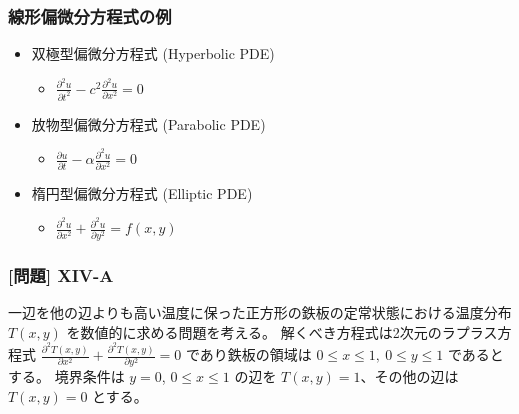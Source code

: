 \documentclass[dvipdfmx,aspectratio=169,20pt]{beamer}
\newcommand{\myfontsetting}[3]{{\fontsize{#1}{#2}\selectfont #3}}
\begin{document}
\begin{frame}
\frametitle{\myfontsetting{24pt}{24pt}{線形偏微分方程式の例}}

\begin{itemize}
    \setlength{\itemsep}{0.5cm}
    \item \myfontsetting{16pt}{16pt}{双極型偏微分方程式} \myfontsetting{12pt}{12pt}{(Hyperbolic PDE)}
    \begin{itemize}
\vspace{1mm}
        \item \myfontsetting{14pt}{14pt}{$\displaystyle \frac{\partial^2 u}{\partial t^2} - c^2 \frac{\partial^2 u}{\partial x^2} = 0$} \hspace{2mm} \myfontsetting{12pt}{12pt}{{\bf [波動方程式]}}
    \end{itemize}
    \item \myfontsetting{16pt}{16pt}{放物型偏微分方程式} \myfontsetting{12pt}{12pt}{(Parabolic PDE)}
\vspace{1mm}
    \begin{itemize}
        \item \myfontsetting{14pt}{14pt}{$\displaystyle \frac{\partial u}{\partial t} - \alpha \frac{\partial^2 u}{\partial x^2} = 0$} \hspace{2mm} \myfontsetting{12pt}{12pt}{{\bf [熱伝導方程式]}}
    \end{itemize}
    \item \myfontsetting{16pt}{16pt}{楕円型偏微分方程式} \myfontsetting{12pt}{12pt}{(Elliptic PDE)}
    \begin{itemize}
\vspace{1mm}
        \item \myfontsetting{14pt}{14pt}{$\displaystyle \frac{\partial^2 u}{\partial x^2} + \frac{\partial^2 u}{\partial y^2} = f(x,y)$} \hspace{2mm} \myfontsetting{8pt}{8pt}{{\bf [ポアソン方程式 \myfontsetting{8pt}{8pt}{{\bf ($f(x,y)=0$ の場合ラプラス方程式)}}]}}

    \end{itemize}
\end{itemize}
\end{frame}
\begin{frame}
\frametitle{[問題] X\hspace{-.1em}I\hspace{-.1em}V-A}


\myfontsetting{14pt}{14pt}{
一辺を他の辺よりも高い温度に保った正方形の鉄板の定常状態における温度分布 $T(x,y)$ を数値的に求める問題を考える。
解くべき方程式は2次元のラプラス方程式 $\frac{\partial^2 T(x,y)}{\partial x^2} + \frac{\partial^2 T(x,y)}{\partial y^2} = 0$ であり鉄板の領域は $0\le x \le 1,\ 0\le y \le 1$ であるとする。
境界条件は $y=0$, $0\le x \le 1$ の辺を $T(x,y) = 1$、その他の辺は $T(x,y) = 0$ とする。
}
\end{frame}
\end{document}
